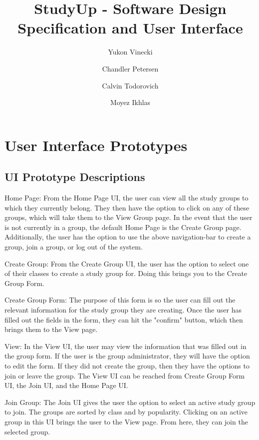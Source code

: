 \documentclass[12pt,letterpaper]{article}
\title{StudyUp - Software Design Specification and User Interface}
\author[1]{Yukon Vinecki}
\author[2]{Chandler Petersen}
\author[3]{Calvin Todorovich}
\author[4]{Moyez Ikhlas}
\affil[1]{vineckiy, EECS - Oregon State University}
\affil[2]{petercha, EECS - Oregon State University}
\affil[3]{todorovc, EECS - Oregon State University}
\affil[4]{ikhlasm, EECS - Oregon State University}
\begin{document}
\maketitle
\clearpage
\tableofcontents
\clearpage
{}

\section{User Interface Prototypes}
\subsection{UI Prototype Descriptions}
Home Page: From the Home Page UI, the user can view all the study groups to which they currently belong. They then have the option to click on any of these groups, which will take them to the View Group page. In the event that the user is not currently in a group, the default Home Page is the Create Group page. Additionally, the user has the option to use the above navigation-bar to create a group, join a group, or log out of the system.

Create Group: From the Create Group UI, the user has the option to select one of their classes to create a study group for. Doing this brings you to the Create Group Form.

Create Group Form: The purpose of this form is so the user can fill out the relevant information for the study group they are creating. Once the user has filled out the fields in the form, they can hit the "confirm" button, which then brings them to the View page.

View: In the View UI, the user may view the information that was filled out in the group form. If the user is the group administrator, they will have the option to edit the form. If they did not create the group, then they have the options to join or leave the group. The View UI can be reached from Create Group Form UI, the Join UI, and the Home Page UI.

Join Group: The Join UI gives the user the option to select an active study group to join. The groups are sorted by class and by popularity. Clicking on an active group in this UI brings the user to the View page. From here, they can join the selected group. 





\clearpage
\end{document}
